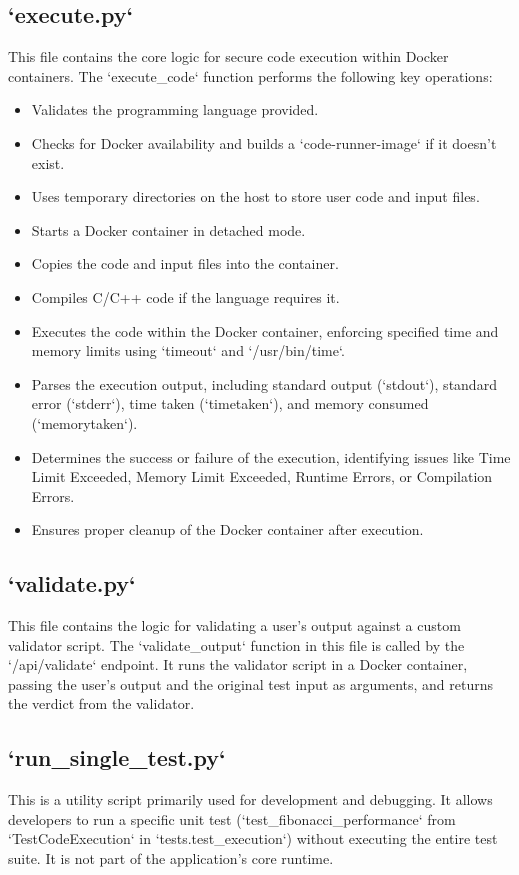 \documentclass{article}
\begin{document}
\subsection*{`execute.py`}
This file contains the core logic for secure code execution within Docker containers. The `execute\_code` function performs the following key operations:
\begin{itemize}
    \item Validates the programming language provided.
    \item Checks for Docker availability and builds a `code-runner-image` if it doesn't exist.
    \item Uses temporary directories on the host to store user code and input files.
    \item Starts a Docker container in detached mode.
    \item Copies the code and input files into the container.
    \item Compiles C/C++ code if the language requires it.
    \item Executes the code within the Docker container, enforcing specified time and memory limits using `timeout` and `/usr/bin/time`.
    \item Parses the execution output, including standard output (`stdout`), standard error (`stderr`), time taken (`timetaken`), and memory consumed (`memorytaken`).
    \item Determines the success or failure of the execution, identifying issues like Time Limit Exceeded, Memory Limit Exceeded, Runtime Errors, or Compilation Errors.
    \item Ensures proper cleanup of the Docker container after execution.
\end{itemize}

\subsection*{`validate.py`}
This file contains the logic for validating a user's output against a custom validator script. The `validate\_output` function in this file is called by the `/api/validate` endpoint. It runs the validator script in a Docker container, passing the user's output and the original test input as arguments, and returns the verdict from the validator.

\subsection*{`run\_single\_test.py`}
This is a utility script primarily used for development and debugging. It allows developers to run a specific unit test (`test_fibonacci\_performance` from `TestCodeExecution` in `tests.test_execution`) without executing the entire test suite. It is not part of the application's core runtime.
\end{document}
